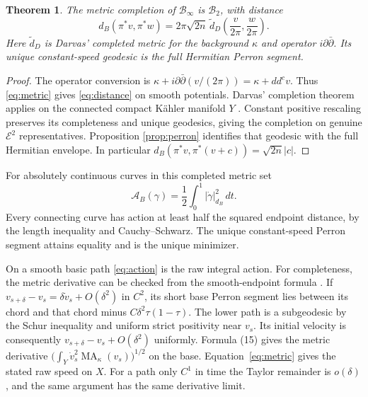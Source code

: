 \documentclass[11pt]{article}
\newcommand{\ddc}{dd^c}
\newcommand{\MA}{\operatorname{MA}}
\newcommand{\BB}{\mathcal B}
\newtheorem{theorem}{Theorem}
\theoremstyle{remark}\newtheorem{remark}[theorem]{Remark}
\begin{document}
\begin{theorem}\label{th:completion}
The metric completion of $\BB_\infty$ is $\BB_2$, with distance
\begin{equation}\label{eq:distance}
 d_B(\pi^*v,\pi^*w)
   =2\pi\sqrt{2n}\,\widetilde d_D
                 \left(\frac{v}{2\pi},\frac{w}{2\pi}\right).
\end{equation}
Here $\widetilde d_D$ is Darvas' completed metric for the background
$\kappa$ and operator $i\partial\bar\partial$.
Its unique constant-speed geodesic is the full Hermitian Perron segment.
\end{theorem}
\begin{proof}
The operator conversion is
$\kappa+i\partial\bar\partial(v/(2\pi))=\kappa+\ddc v$.
Thus \eqref{eq:metric} gives \eqref{eq:distance} on smooth potentials.
Darvas' completion theorem applies on the connected compact K\"ahler
manifold $Y$ \cite[Theorems 6.1 and 9.2]{Darvas}. Constant positive
rescaling preserves its completeness and unique geodesics, giving the
completion on genuine $\mathcal E^2$ representatives. Proposition
\ref{prop:perron} identifies that geodesic with the full Hermitian
envelope. In particular
$d_B(\pi^*v,\pi^*(v+c))=\sqrt{2n}|c|$.
\end{proof}

For absolutely continuous curves in this completed metric set
\begin{equation}\label{eq:action}
 \mathcal A_B(\gamma)=\frac12\int_0^1|\dot\gamma|_{d_B}^2\,dt.
\end{equation}
Every connecting curve has action at least half the squared endpoint
distance, by the length inequality and Cauchy--Schwarz. The unique
constant-speed Perron segment attains equality and is the unique minimizer.

On a smooth basic path \eqref{eq:action} is the raw integral action.
For completeness, the metric derivative can be checked from the
smooth-endpoint formula \cite[(15)]{Darvas}. If $v_{s+\delta}-v_s
=\delta\dot v_s+O(\delta^2)$ in $C^2$, its short base Perron segment
lies between its chord and that chord minus
$C\delta^2\tau(1-\tau)$. The lower path is a subgeodesic by the
Schur inequality and uniform strict positivity near $v_s$.
Its initial velocity is consequently
$v_{s+\delta}-v_s+O(\delta^2)$ uniformly. Formula (15) gives the
metric derivative $\bigl(\int_Y\dot v_s^2\MA_\kappa(v_s)\bigr)^{1/2}$
on the base. Equation~\eqref{eq:metric} gives the stated raw speed on $X$.
For a path only $C^1$ in time the Taylor remainder is $o(\delta)$,
and the same argument has the same derivative limit.
\end{document}
